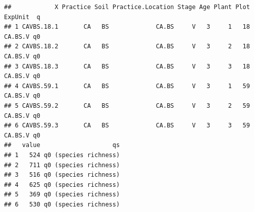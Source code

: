 \documentclass[]{interact}
\theoremstyle{plain}%
\theoremstyle{definition}
\theoremstyle{remark}
\newenvironment{Shaded}{\begin{snugshade}}{\end{snugshade}}
\newcommand{\AttributeTok}[1]{\textcolor[rgb]{0.77,0.63,0.00}{#1}}
\newcommand{\ConstantTok}[1]{\textcolor[rgb]{0.00,0.00,0.00}{#1}}
\newcommand{\FunctionTok}[1]{\textcolor[rgb]{0.00,0.00,0.00}{#1}}
\newcommand{\NormalTok}[1]{#1}
\newcommand{\OtherTok}[1]{\textcolor[rgb]{0.56,0.35,0.01}{#1}}
\newcommand{\SpecialCharTok}[1]{\textcolor[rgb]{0.00,0.00,0.00}{#1}}
\newcommand{\StringTok}[1]{\textcolor[rgb]{0.31,0.60,0.02}{#1}}
\begin{document}
\begin{Shaded}
\end{Shaded}

\begin{verbatim}
##            X Practice Soil Practice.Location Stage Age Plant Plot ExpUnit  q
## 1 CAVBS.18.1       CA   BS             CA.BS     V   3     1   18 CA.BS.V q0
## 2 CAVBS.18.2       CA   BS             CA.BS     V   3     2   18 CA.BS.V q0
## 3 CAVBS.18.3       CA   BS             CA.BS     V   3     3   18 CA.BS.V q0
## 4 CAVBS.59.1       CA   BS             CA.BS     V   3     1   59 CA.BS.V q0
## 5 CAVBS.59.2       CA   BS             CA.BS     V   3     2   59 CA.BS.V q0
## 6 CAVBS.59.3       CA   BS             CA.BS     V   3     3   59 CA.BS.V q0
##   value                    qs
## 1   524 q0 (species richness)
## 2   711 q0 (species richness)
## 3   516 q0 (species richness)
## 4   625 q0 (species richness)
## 5   369 q0 (species richness)
## 6   530 q0 (species richness)
\end{verbatim}
\end{document}
